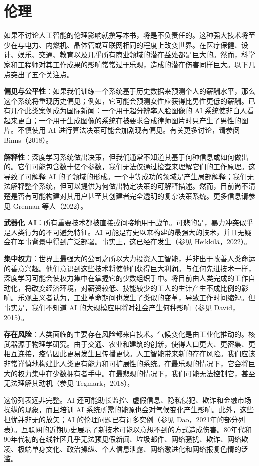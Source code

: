 \documentclass[lang=cn,newtx,10pt,scheme=chinese]{elegantbook}
\begin{document}
\section{伦理}
如果不讨论人工智能的伦理影响就撰写本书，将是不负责任的。这种强大技术将至少在与电力、内燃机、晶体管或互联网相同的程度上改变世界。在医疗保健、设计、娱乐、交通、教育以及几乎所有商业领域的潜在益处都是巨大的。然而，科学家和工程师对其工作成果的影响常常过于乐观，造成的潜在伤害同样巨大。以下几点突出了五个关注点。

\textbf{偏见与公平性}：如果我们训练一个系统基于历史数据来预测个人的薪酬水平，那么这个系统将重现历史偏见；例如，它可能会预测女性应获得比男性更低的薪酬。已有几个此类案例成为国际新闻：一个用于超分辨率人脸图像的 AI 系统使非白人看起来更白；一个用于生成图像的系统在被要求合成律师图片时只产生了男性的图片。不慎使用 AI 进行算法决策可能会加剧现有偏见。有关更多讨论，请参阅 Binns（2018）。


\textbf{解释性}：深度学习系统做出决策，但我们通常不知道其基于何种信息或如何做出的。它们可能包含数十亿个参数，我们无法仅通过检查来理解它们的工作原理。这导致了可解释 AI 的子领域的形成。一个中等成功的领域是产生局部解释；我们无法解释整个系统，但可以提供为何做出特定决策的可解释描述。然而，目前尚不清楚是否有可能构建对其用户甚至其创建者完全透明的复杂决策系统。更多信息请参见 Grennan 等人（2022）。


\textbf{武器化 AI}：所有重要技术都被直接或间接地用于战争。可悲的是，暴力冲突似乎是人类行为的不可避免特征。AI 可能是有史以来构建的最强大的技术，并且无疑会在军事背景中得到广泛部署。事实上，这已经在发生（参见 Heikkilä，2022）。


\textbf{集中权力}：世界上最强大的公司之所以大力投资人工智能，并非出于改善人类命运的善意兴趣。他们意识到这些技术将使他们获得巨大利润。与任何先进技术一样，深度学习可能会使权力集中在掌握它的少数组织手中。将目前由人类完成的工作自动化，将改变经济环境，对薪资较低、技能较少的工人的生计产生不成比例的影响。乐观主义者认为，工业革命期间也发生了类似的变革，导致工作时间缩短。但事实是，我们不知道 AI 的大规模应用将对社会产生何种影响（参见 David，2015）。


\textbf{存在风险}：人类面临的主要存在风险都来自技术。气候变化是由工业化推动的。核武器源于物理学研究。由于交通、农业和建筑的创新，使得人口更大、更密集、更相互连接，疫情因此更易发生且传播更快。人工智能带来新的存在风险。我们应该非常谨慎地构建比人类更有能力和可扩展性的系统。在最乐观的情况下，它会将巨大的权力集中在少数拥有者手中。在最悲观的情况下，我们可能无法控制它，甚至无法理解其动机（参见 Tegmark，2018）。

这份列表远非完整。AI 还可能助长监控、虚假信息、隐私侵犯、欺诈和金融市场操纵的现象，而且培训 AI 系统所需的能源也会对气候变化产生影响。此外，这些担忧并非无的放矢；AI 的伦理问题已有许多实例（参见 Dao，2021年的部分列表）。互联网的近期历史展示了新技术可能以意想不到的方式造成伤害。80年代和90年代初的在线社区几乎无法预见假新闻、垃圾邮件、网络骚扰、欺诈、网络欺凌、极端单身文化、政治操纵、个人信息泄露、网络激进化和网络报复色情的泛滥。
\end{document}
